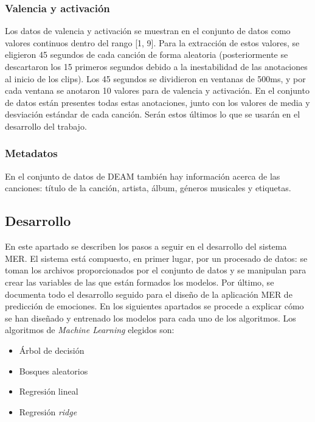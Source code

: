 \documentclass[12pt,a4paper,Spanish]{article}
\begin{document}
\subsubsection{Valencia y activación}
Los datos de valencia y activación se muestran en el conjunto de datos como valores continuos dentro del rango [1, 9].
\newline
Para la extracción de estos valores, se eligieron 45 segundos de cada canción de forma aleatoria (posteriormente se descartaron los 15 primeros segundos debido a la inestabilidad de las anotaciones al inicio de los clips). Los 45 segundos se dividieron en ventanas de 500ms, y por cada ventana se anotaron 10 valores para de valencia y activación.
\newline
En el conjunto de datos están presentes todas estas anotaciones, junto con los valores de media y desviación estándar de cada canción. Serán estos últimos lo que se usarán en el desarrollo del trabajo.



\subsubsection{Metadatos}
En el conjunto de datos de DEAM \cite{AlajankiEmoInMusicAnalysis} también hay información acerca de las canciones: título de la canción, artista, álbum, géneros musicales y etiquetas.




\subsection{Desarrollo}
En este apartado se describen los pasos a seguir en el desarrollo del sistema MER. El sistema está compuesto, en primer lugar, por un procesado de datos: se toman los archivos proporcionados por el conjunto de datos y se manipulan para crear las variables de las que están formados los modelos.
\newline
Por último, se documenta todo el desarrollo seguido para el diseño de la aplicación MER de predicción de emociones. En los siguientes apartados se procede a explicar cómo se han diseñado y entrenado los modelos  para cada uno de los algoritmos. Los algoritmos de \textit{Machine Learning} elegidos son:
\begin{itemize}
	\item Árbol de decisión
	\item Bosques aleatorios
	\item Regresión lineal
	\item Regresión \textit{ridge}
\end{itemize}
\end{document}
